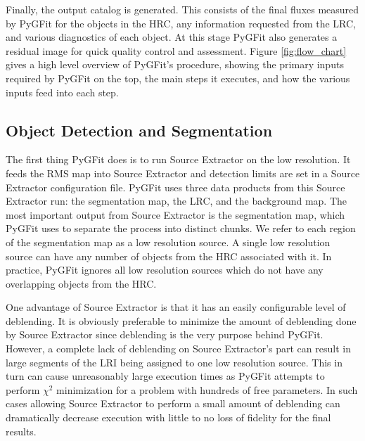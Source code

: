 \documentclass[apj]{emulateapj}
\newcommand{\pygfit}{PyGFit}
\newcommand{\extractor}{Source Extractor}
\begin{document}
Finally, the output catalog is generated.  This consists of the final fluxes measured by \pygfit{} for the objects in the HRC, any information requested from the LRC, and various diagnostics of each object.  At this stage \pygfit{} also generates a residual image for quick quality control and assessment.  Figure \ref{fig:flow_chart} gives a high level overview of \pygfit{}'s procedure, showing the primary inputs required by \pygfit{} on the top, the main steps it executes, and how the various inputs feed into each step.

\begin{figure*}
\caption{A flow chart of \pygfit{}'s procedure.  Rectangles denote computational processes executed by \pygfit{} while the page symbols denote data products created by or used by \pygfit{}.  The five data products along the top are inputs which must be provided to \pygfit{}.}\label{fig:flow_chart}
\end{figure*}

\subsection{Object Detection and Segmentation}\label{sec:segmentation}

The first thing \pygfit{} does is to run \extractor{} on the low resolution.  It feeds the RMS map into \extractor{} and detection limits are set in a \extractor{} configuration file.  \pygfit{} uses three data products from this \extractor{} run: the segmentation map, the LRC, and the background map.  The most important output from \extractor{} is the segmentation map, which \pygfit{} uses to separate the process into distinct chunks.  We refer to each region of the segmentation map as a low resolution source.  A single low resolution source can have any number of objects from the HRC associated with it.  In practice, \pygfit{} ignores all low resolution sources which do not have any overlapping objects from the HRC.

One advantage of \extractor{} is that it has an easily configurable level of deblending.  It is obviously preferable to minimize the amount of deblending done by \extractor{} since deblending is the very purpose behind \pygfit{}.  However, a complete lack of deblending on \extractor{}'s part can result in large segments of the LRI being assigned to one low resolution source.  This in turn can cause unreasonably large execution times as \pygfit{} attempts to perform $\chi^2$ minimization for a problem with hundreds of free parameters.  In such cases allowing \extractor{} to perform a small amount of deblending can dramatically decrease execution with little to no loss of fidelity for the final results.
\end{document}
